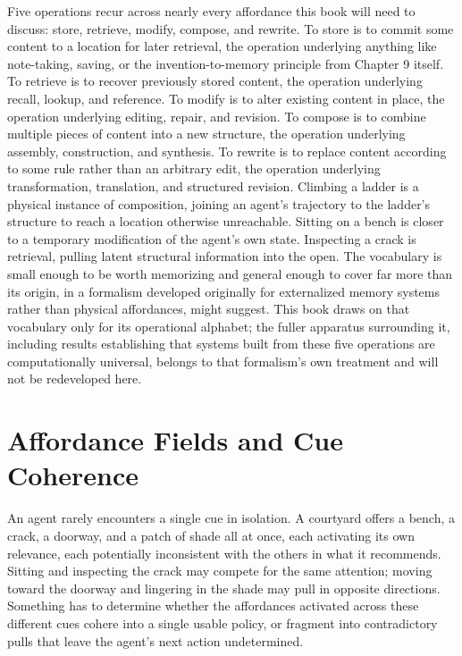 Five operations recur across nearly every affordance this book will need to discuss: store, retrieve, modify, compose, and rewrite. To store is to commit some content to a location for later retrieval, the operation underlying anything like note-taking, saving, or the invention-to-memory principle from Chapter 9 itself. To retrieve is to recover previously stored content, the operation underlying recall, lookup, and reference. To modify is to alter existing content in place, the operation underlying editing, repair, and revision. To compose is to combine multiple pieces of content into a new structure, the operation underlying assembly, construction, and synthesis. To rewrite is to replace content according to some rule rather than an arbitrary edit, the operation underlying transformation, translation, and structured revision. Climbing a ladder is a physical instance of composition, joining an agent's trajectory to the ladder's structure to reach a location otherwise unreachable. Sitting on a bench is closer to a temporary modification of the agent's own state. Inspecting a crack is retrieval, pulling latent structural information into the open. The vocabulary is small enough to be worth memorizing and general enough to cover far more than its origin, in a formalism developed originally for externalized memory systems rather than physical affordances, might suggest. This book draws on that vocabulary only for its operational alphabet; the fuller apparatus surrounding it, including results establishing that systems built from these five operations are computationally universal, belongs to that formalism's own treatment and will not be redeveloped here.

\section{Affordance Fields and Cue Coherence}

An agent rarely encounters a single cue in isolation. A courtyard offers a bench, a crack, a doorway, and a patch of shade all at once, each activating its own relevance, each potentially inconsistent with the others in what it recommends. Sitting and inspecting the crack may compete for the same attention; moving toward the doorway and lingering in the shade may pull in opposite directions. Something has to determine whether the affordances activated across these different cues cohere into a single usable policy, or fragment into contradictory pulls that leave the agent's next action undetermined.

